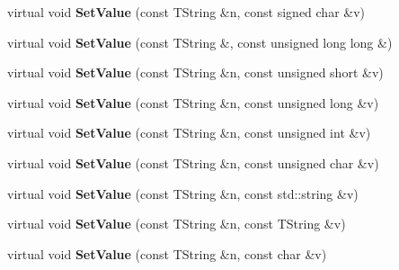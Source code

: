 \begin{DoxyCompactItemize}
\item 
\hypertarget{class_h_a_l_1_1_analysis_data_ae248b4f6c90034c9a41f8f8618ed89b8}{virtual void {\bfseries Set\+Value} (const T\+String \&n, const signed char \&v)}\label{class_h_a_l_1_1_analysis_data_ae248b4f6c90034c9a41f8f8618ed89b8}

\item 
\hypertarget{class_h_a_l_1_1_analysis_data_a0d21eebe0e1566531fa5c736f2cc6ed2}{virtual void {\bfseries Set\+Value} (const T\+String \&, const unsigned long long \&)}\label{class_h_a_l_1_1_analysis_data_a0d21eebe0e1566531fa5c736f2cc6ed2}

\item 
\hypertarget{class_h_a_l_1_1_analysis_data_a08be235fce5fd10cfafc592a2d9c1448}{virtual void {\bfseries Set\+Value} (const T\+String \&n, const unsigned short \&v)}\label{class_h_a_l_1_1_analysis_data_a08be235fce5fd10cfafc592a2d9c1448}

\item 
\hypertarget{class_h_a_l_1_1_analysis_data_af9cca2f941fef23004516aefc0d9c00d}{virtual void {\bfseries Set\+Value} (const T\+String \&n, const unsigned long \&v)}\label{class_h_a_l_1_1_analysis_data_af9cca2f941fef23004516aefc0d9c00d}

\item 
\hypertarget{class_h_a_l_1_1_analysis_data_adac44d46dc879cda67371131c18cf233}{virtual void {\bfseries Set\+Value} (const T\+String \&n, const unsigned int \&v)}\label{class_h_a_l_1_1_analysis_data_adac44d46dc879cda67371131c18cf233}

\item 
\hypertarget{class_h_a_l_1_1_analysis_data_ab3237d1010394bff323821642ea2380c}{virtual void {\bfseries Set\+Value} (const T\+String \&n, const unsigned char \&v)}\label{class_h_a_l_1_1_analysis_data_ab3237d1010394bff323821642ea2380c}

\item 
\hypertarget{class_h_a_l_1_1_analysis_data_a3fcb628c26524a1cc11db49295581d2d}{virtual void {\bfseries Set\+Value} (const T\+String \&n, const std\+::string \&v)}\label{class_h_a_l_1_1_analysis_data_a3fcb628c26524a1cc11db49295581d2d}

\item 
\hypertarget{class_h_a_l_1_1_analysis_data_acb8dd69db78b9d748ad4966584c7fa78}{virtual void {\bfseries Set\+Value} (const T\+String \&n, const T\+String \&v)}\label{class_h_a_l_1_1_analysis_data_acb8dd69db78b9d748ad4966584c7fa78}

\item 
\hypertarget{class_h_a_l_1_1_analysis_data_a7ffd3d35192f72eeadb3274a9bf8694d}{virtual void {\bfseries Set\+Value} (const T\+String \&n, const char \&v)}\label{class_h_a_l_1_1_analysis_data_a7ffd3d35192f72eeadb3274a9bf8694d}


\end{DoxyCompactItemize}
